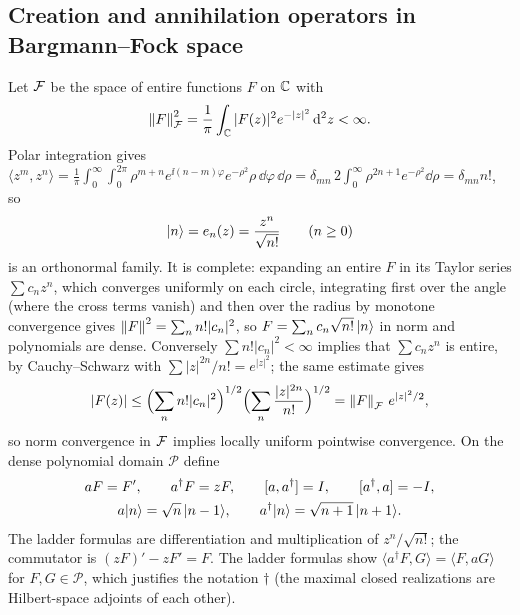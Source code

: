 \subsection{Creation and annihilation operators in Bargmann--Fock space}
Let $\mathcal{F}$ be the space of entire functions $F$ on $\mathbb{C}$ with
\begin{equation}\label{eq:focknorm}
 \left\lVert F\right\rVert_{\mathcal{F}}^2=\frac1\pi\int_{\mathbb{C}}|F(z)|^2e^{-|z|^2}\,\mathrm{d}^2z<\infty.
\end{equation}
Polar integration gives $\langle z^m,z^n\rangle=\frac1\pi\int_0^\infty\!\!\int_0^{2\pi}
\rho^{m+n}e^{\ii(n-m)\varphi}e^{-\rho^2}\rho\,\dd\varphi\,\dd\rho=\delta_{mn}\,2\int_0^\infty\rho^{2n+1}e^{-\rho^2}\dd\rho=\delta_{mn}n!$,
so
\begin{equation}\label{eq:fockbasis}
 \lvert n\rangle=e_n(z)=\frac{z^n}{\sqrt{n!}}\qquad(n\geq0)
\end{equation}
is an orthonormal family. It is complete: expanding an entire $F$ in its
Taylor series $\sum c_nz^n$, which converges uniformly on each circle,
integrating first over the angle (where the cross terms vanish) and then
over the radius by monotone convergence gives
$\left\lVert F\right\rVert^2=\sum_nn!|c_n|^2$, so $F=\sum_nc_n\sqrt{n!}\,\lvert n\rangle$ in norm and
polynomials are dense. Conversely $\sum n!|c_n|^2<\infty$ implies that
$\sum c_nz^n$ is entire, by Cauchy--Schwarz with
$\sum|z|^{2n}/n!=e^{|z|^2}$; the same estimate gives
\begin{equation}\label{eq:pointeval}
 |F(z)|\leq\Bigl(\sum_nn!|c_n|^2\Bigr)^{1/2}\Bigl(\sum_n\frac{|z|^{2n}}{n!}\Bigr)^{1/2}
 =\left\lVert F\right\rVert_{\mathcal{F}}\,e^{|z|^2/2},
\end{equation}
so norm convergence in $\mathcal{F}$ implies locally uniform pointwise convergence.
On the dense polynomial domain $\mathcal P$ define
\begin{equation}\label{eq:creation}
\begin{gathered}
 aF=F',\qquad a^\dagger F=zF,\qquad
 [a,a^\dagger]=I,\qquad[a^\dagger,a]=-I,\\
 a\lvert n\rangle=\sqrt n\,\lvert n-1\rangle,\qquad a^\dagger\lvert n\rangle=\sqrt{n+1}\,\lvert n+1\rangle.
\end{gathered}
\end{equation}
The ladder formulas are differentiation and multiplication of $z^n/\sqrt{n!}$;
the commutator is $(zF)'-zF'=F$. The ladder formulas show
$\langle a^\dagger F,G\rangle=\langle F,aG\rangle$ for $F,G\in\mathcal P$,
which justifies the notation $\dagger$ (the maximal closed realizations are
Hilbert-space adjoints of each other).

